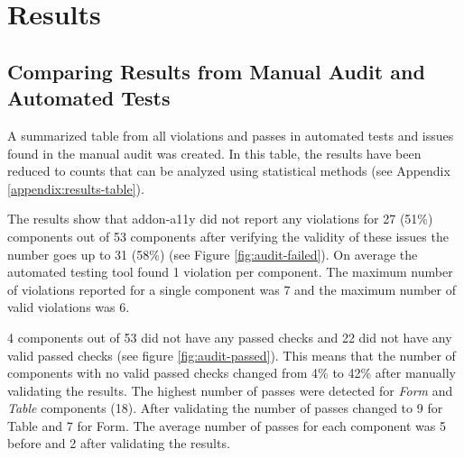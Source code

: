 \documentclass{master_thesis}
\begin{document}
\section{Results}

\subsection{Comparing Results from Manual Audit and Automated Tests}


A summarized table from all violations and passes in automated tests and issues found in the manual audit was created. In this table, the results have been reduced to counts that can be analyzed using statistical methods (see Appendix \ref{appendix:results-table}).

The results show that addon-a11y did not report any violations for 27 (51\%) components out of 53 components after verifying the validity of these issues the number goes up to 31 (58\%) (see Figure \ref{fig:audit-failed}). On average the automated testing tool found 1 violation per component. The maximum number of violations reported for a single component was 7 and the maximum number of valid violations was 6.

4 components out of 53 did not have any passed checks and 22 did not have any valid passed checks (see figure \ref{fig:audit-passed}). This means that the number of components with no valid passed checks changed from 4\%  to 42\% after manually validating the results. The highest number of passes were detected for \textit{Form} and \textit{Table} components (18). After validating the number of passes changed to 9 for Table and 7 for Form. The average number of passes for each component was 5 before and 2 after validating the results.
\end{document}
